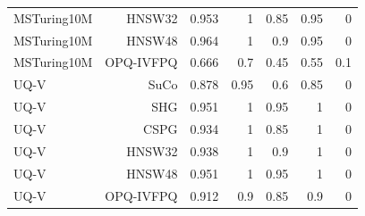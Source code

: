 \begin{table}[t]
\begin{tabular}{lrrrrrr}
MSTuring10M & HNSW32 & 0.953 & 1 & 0.85 & 0.95 & 0 \\
MSTuring10M & HNSW48 & 0.964 & 1 & 0.9 & 0.95 & 0 \\
MSTuring10M & OPQ-IVFPQ & 0.666 & 0.7 & 0.45 & 0.55 & 0.1 \\
UQ-V & SuCo & 0.878 & 0.95 & 0.6 & 0.85 & 0 \\
UQ-V & SHG & 0.951 & 1 & 0.95 & 1 & 0 \\
UQ-V & CSPG & 0.934 & 1 & 0.85 & 1 & 0 \\
UQ-V & HNSW32 & 0.938 & 1 & 0.9 & 1 & 0 \\
UQ-V & HNSW48 & 0.951 & 1 & 0.95 & 1 & 0 \\
UQ-V & OPQ-IVFPQ & 0.912 & 0.9 & 0.85 & 0.9 & 0 \\
\bottomrule
\end{tabular}
\end{table}

